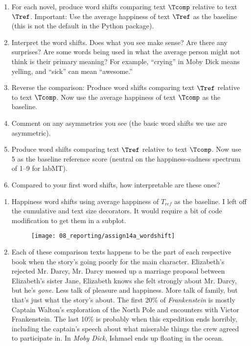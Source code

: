 \begin{enumerate}
  \begin{enumerate} 
  \item 
    For each novel,
    produce word shifts comparing text $\Tcomp$ relative to text $\Tref$.
    Important: Use the average happiness of text $\Tref$ as the baseline (this is not the default in the Python package).

  \item 
    Interpret the word shifts. Does what you see make sense?
    Are there any surprises?
    Are some words being used in what the average person might not think is their primary meaning?
    For example, ``crying'' in Moby Dick means yelling, and ``sick'' can mean ``awesome.''
  \item
    Reverse the comparison:
    Produce word shifts comparing text $\Tref$ relative to text $\Tcomp$.
    Now use the average happiness of text $\Tcomp$ as the baseline.
    
  \item
    Comment on any asymmetries you see (the basic word shifts we use are asymmetric).
  \item
    Produce word shifts comparing text $\Tref$ relative to text $\Tcomp$.
    Now use 5 as the baseline reference score (neutral on the happiness-sadness spectrum of 1--9 for labMT).
    
  \item
    Compared to your first word shifts, how interpretable are these ones?
  \end{enumerate}

  
   \solutionstart
	
	\begin{enumerate}
		\item 
		Happiness word shifts using average happiness of $T_{ref}$ as the baseline. I left off the cumulative and text size decorators. It would require a bit of code modification to get them in a subplot.
		
			\begin{figure}[H]
				\centering
				\texttt{[image: 08\_reporting/assign14a\_wordshift]}
				\label{fig:wordshift}
			\end{figure}
	
		\item
		Each of these comparison texts happens to be the part of each respective book when the story's going poorly for the main character. Elizabeth's rejected Mr. Darcy, Mr. Darcy messed up a marriage proposal between Elizabeth's sister Jane, Elizabeth knows she felt strongly about Mr. Darcy, but he's \textit{gone}. Less talk of pleasure and happiness. More talk of family, but that's just what the story's about. The first 20\% of \textit{Frankenstein} is mostly Captain Walton's exploration of the North Pole and encounters with Victor Frankenstein. The last 10\% is probably when this expedition ends horribly, including the captain's speech about what miserable things the crew agreed to participate in. In \textit{Moby Dick}, Ishmael ends up floating in the ocean. 
		

\end{enumerate}
\end{enumerate}
